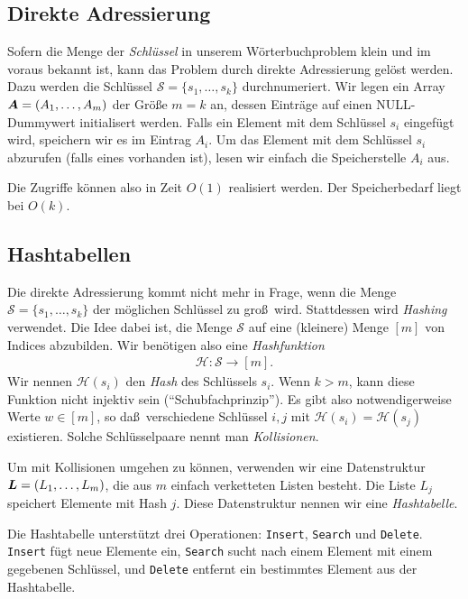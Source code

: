\documentclass[10pt,reqno]{amsart}
\numberwithin{equation}{section}
\newcommand\cH{\mathcal H}
\newcommand\cS{\mathcal S}
\newcommand\vA{\vec A}
\newcommand\vL{\vec L}
\def\vec#1{\mathchoice{\mbox{\boldmath$\displaystyle#1$}}
{\mbox{\boldmath$\textstyle#1$}}
{\mbox{\boldmath$\scriptstyle#1$}}
{\mbox{\boldmath$\scriptscriptstyle#1$}}}
\begin{document}
\subsection{Direkte Adressierung}\label{sec_direct}
Sofern die Menge der {\em Schl\"ussel} in unserem W\"orterbuchproblem klein und im voraus bekannt ist, kann das Problem durch direkte Adressierung gel\"ost werden.
Dazu werden die Schl\"ussel $\cS=\{s_1,\ldots,s_k\}$ durchnumeriert.
Wir legen ein Array $\vA=(A_1,\ldots,A_m)$ der Gr\"o\ss e $m=k$ an, dessen Eintr\"age auf einen NULL-Dummywert initialisert werden.
Falls ein Element mit dem Schl\"ussel $s_i$ eingef\"ugt wird, speichern wir es im Eintrag $A_i$.
Um das Element mit dem Schl\"ussel $s_i$ abzurufen (falls eines vorhanden ist), lesen wir einfach die Speicherstelle $A_i$ aus.

Die Zugriffe k\"onnen also in Zeit $O(1)$ realisiert werden.
Der Speicherbedarf liegt bei $O(k)$.

\subsection{Hashtabellen}\label{sec_hashtable}
Die direkte Adressierung kommt nicht mehr in Frage, wenn die Menge $\cS=\{s_1,\ldots,s_k\}$ der m\"oglichen Schl\"ussel zu gro\ss\ wird.
Stattdessen wird {\em Hashing} verwendet.
Die Idee dabei ist, die Menge $\cS$ auf eine (kleinere) Menge $[m]$ von Indices abzubilden.
Wir ben\"otigen also eine {\em Hashfunktion}
\begin{align*}
	\cH:\cS\to[m].
\end{align*}
Wir nennen $\cH(s_i)$ den {\em Hash} des Schl\"ussels $s_i$.
Wenn $k>m$, kann diese Funktion nicht injektiv sein (``Schubfachprinzip'').
Es gibt also notwendigerweise Werte $w\in[m]$, so da\ss\ verschiedene Schl\"ussel $i,j$ mit $\cH(s_i)=\cH(s_j)$ existieren.
Solche Schl\"usselpaare nennt man {\em Kollisionen}.

Um mit Kollisionen umgehen zu k\"onnen, verwenden wir eine Datenstruktur $\vL=(L_1,\ldots,L_m)$, die aus $m$ einfach verketteten Listen besteht.
Die Liste $L_j$ speichert Elemente mit Hash $j$.
Diese Datenstruktur nennen wir eine {\em Hashtabelle}.

Die Hashtabelle unterst\"utzt drei Operationen: {\tt Insert}, {\tt Search} und {\tt Delete}.
{\tt Insert} f\"ugt neue Elemente ein, {\tt Search} sucht nach einem Element mit einem gegebenen Schl\"ussel, und {\tt Delete} entfernt ein bestimmtes Element aus der Hashtabelle.
\end{document}
